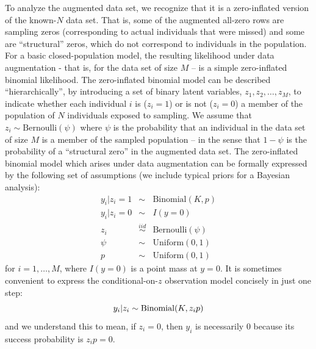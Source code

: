 To analyze the augmented data set, we recognize that it is a
zero-inflated version of the known-$N$ data set. That is, some of the
augmented all-zero rows are sampling zeros (corresponding to actual
individuals that were missed) and some are ``structural'' zeros, which
do not correspond to individuals in the population. For a basic
closed-population model, the resulting likelihood under data
augmentation - that is, for the data set of size $M$ -- is a simple
zero-inflated binomial likelihood.  The zero-inflated binomial model
can be described ``hierarchically'', by introducing a set of binary
latent variables, $z_{1},z_{2},\ldots, z_{M}$, to indicate whether
each individual $i$ is ($z_i=1$) or is not ($z_i=0$) a member of the
population of $N$ individuals exposed to sampling. We assume that
$z_{i} \sim \mbox{Bernoulli}(\psi)$ where $\psi$ is the probability that an
individual in the data set of size $M$ is a member of the sampled
population -- in the sense that $1-\psi$ is the probability of
a
``structural zero'' in the augmented data set.  The
zero-inflated binomial model which arises under data augmentation can
be formally expressed by the following set of assumptions (we include
typical priors for a Bayesian analysis):
\begin{eqnarray*}
 y_{i}|{z_{i}=1} & \sim  &\mbox{Binomial}(K, p) \\
 y_{i}|{z_{i}=0} & \sim &  I(y=0)  \\
 z_{i} & \stackrel{iid}{\sim} & \mbox{Bernoulli}(\psi) \\
 \psi & \sim & \mathrm{Uniform}(0,1) \\
 p & \sim & \mathrm{Uniform}(0,1)
\end{eqnarray*}
for $i=1, \ldots, M$, where $I(y=0)$ is a point mass at
$y=0$.
It is sometimes convenient to express the conditional-on-$z$
observation model concisely in
just one step:
\[
 y_{i}|z_{i}  \sim  \mbox{Binomial}(K, z_{i} p) \\
\]
and we understand this to mean, if $z_{i}=0$, then $y_{i}$ is
necessarily 0 because its success probability is $z_{i} p = 0$.

